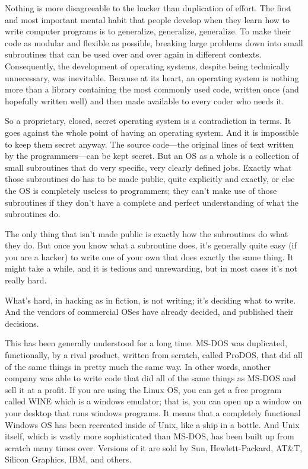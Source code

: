 \documentclass[
  fontsize=11pt,
  paper=landscape,
  twocolumn=true,
  pagesize=pdftex,
  headings=small,
  DIV=15,
  ]{scrartcl}
\begin{document}
Nothing is more disagreeable to the hacker than duplication of effort.
The first and most important mental habit that people develop when they
learn how to write computer programs is to generalize, generalize,
generalize. To make their code as modular and flexible as possible,
breaking large problems down into small subroutines that can be used
over and over again in different contexts. Consequently, the development
of operating systems, despite being technically unnecessary, was
inevitable. Because at its heart, an operating system is nothing more
than a library containing the most commonly used code, written once (and
hopefully written well) and then made available to every coder who needs
it.

So a proprietary, closed, secret operating system is a contradiction in
terms. It goes against the whole point of having an operating system.
And it is impossible to keep them secret anyway. The source code---the
original lines of text written by the programmers---can be kept secret.
But an OS as a whole is a collection of small subroutines that do very
specific, very clearly defined jobs. Exactly what those subroutines do
has to be made public, quite explicitly and exactly, or else the OS is
completely useless to programmers; they can't make use of those
subroutines if they don't have a complete and perfect understanding of
what the subroutines do.

The only thing that isn't made public is exactly how the subroutines do
what they do. But once you know what a subroutine does, it's generally
quite easy (if you are a hacker) to write one of your own that does
exactly the same thing. It might take a while, and it is tedious and
unrewarding, but in most cases it's not really hard.

What's hard, in hacking as in fiction, is not writing; it's deciding
what to write. And the vendors of commercial OSes have already decided,
and published their decisions.

This has been generally understood for a long time. MS-DOS was
duplicated, functionally, by a rival product, written from scratch,
called ProDOS, that did all of the same things in pretty much the same
way. In other words, another company was able to write code that did all
of the same things as MS-DOS and sell it at a profit. If you are using
the Linux OS, you can get a free program called WINE which is a windows
emulator; that is, you can open up a window on your desktop that runs
windows programs. It means that a completely functional Windows OS has
been recreated inside of Unix, like a ship in a bottle. And Unix itself,
which is vastly more sophisticated than MS-DOS, has been built up from
scratch many times over. Versions of it are sold by Sun,
Hewlett-Packard, AT\&T, Silicon Graphics, IBM, and others.
\end{document}
